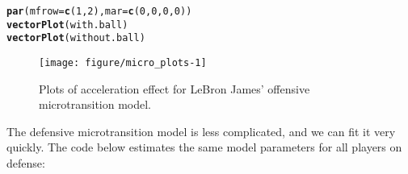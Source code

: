 \documentclass{article}\usepackage[]{graphicx}\usepackage[]{color}
\makeatletter
\newcommand{\hlnum}[1]{\textcolor[rgb]{0.686,0.059,0.569}{#1}}%
\newcommand{\hlstr}[1]{\textcolor[rgb]{0.192,0.494,0.8}{#1}}%
\newcommand{\hlcom}[1]{\textcolor[rgb]{0.678,0.584,0.686}{\textit{#1}}}%
\newcommand{\hlopt}[1]{\textcolor[rgb]{0,0,0}{#1}}%
\newcommand{\hlstd}[1]{\textcolor[rgb]{0.345,0.345,0.345}{#1}}%
\newcommand{\hlkwb}[1]{\textcolor[rgb]{0.69,0.353,0.396}{#1}}%
\newcommand{\hlkwc}[1]{\textcolor[rgb]{0.333,0.667,0.333}{#1}}%
\newcommand{\hlkwd}[1]{\textcolor[rgb]{0.737,0.353,0.396}{\textbf{#1}}}%
\newenvironment{kframe}{%
 \def\at@end@of@kframe{}%
 \ifinner\ifhmode%
  \def\at@end@of@kframe{\end{minipage}}%
  \begin{minipage}{\columnwidth}%
 \fi\fi%
 \def\FrameCommand##1{\hskip\@totalleftmargin \hskip-\fboxsep
 \colorbox{shadecolor}{##1}\hskip-\fboxsep
     \hskip-\linewidth \hskip-\@totalleftmargin \hskip\columnwidth}%
 \MakeFramed {\advance\hsize-\width
   \@totalleftmargin\z@ \linewidth\hsize
   \@setminipage}}%
 {\par\unskip\endMakeFramed%
 \at@end@of@kframe}
\newenvironment{knitrout}{}{} %
\makeatother
\begin{document}
\begin{knitrout}\footnotesize
{}\color{fgcolor}\begin{kframe}
\begin{alltt}
\hlkwd{par}\hlstd{(}\hlkwc{mfrow}\hlstd{=}\hlkwd{c}\hlstd{(}\hlnum{1}\hlstd{,}\hlnum{2}\hlstd{),} \hlkwc{mar}\hlstd{=}\hlkwd{c}\hlstd{(}\hlnum{0}\hlstd{,}\hlnum{0}\hlstd{,}\hlnum{0}\hlstd{,}\hlnum{0}\hlstd{))}
\hlkwd{vectorPlot}\hlstd{(with.ball)}
\hlkwd{vectorPlot}\hlstd{(without.ball)}
\end{alltt}
\end{kframe}\begin{figure}[H]

{\centering \texttt{[image: figure/micro\_plots-1]} 

}

\caption[Plots of acceleration effect for LeBron James' offensive microtransition model]{Plots of acceleration effect for LeBron James' offensive microtransition model.}\label{fig:micro_plots}
\end{figure}


\end{knitrout}

The defensive microtransition model is less complicated, and we can fit it very quickly. The code below estimates the same model parameters for all players on defense:

\end{document}

